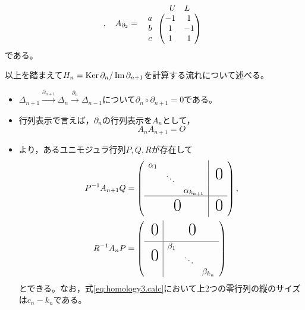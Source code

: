 \documentclass[uplatex]{jsarticle}
\begin{document}
\begin{rei}[射影平面の場合]
\begin{equation}
\begin{array}{c@{\,}c}
    \end{array}
    , \quad 
    A_{\partial_{2}} = \begin{array}{c@{\,}c}
      & \begin{array}{cc}
        U & L
      \end{array} \\
      \begin{array}{c}
        a \\ b \\ c
      \end{array} &
      \begin{pmatrix}
      -1 & 1 \\
      1 & -1 \\
      1 & 1
    \end{pmatrix}
  \end{array}
  \end{equation}
  である。
\end{rei}

以上を踏まえて$H_{n} = \operatorname{Ker} \partial_{n} / \operatorname{Im} \partial_{n+1}$を計算する流れについて述べる。

\sukima{}
\begin{itemize}
  \item $\Delta_{n+1} \xrightarrow{\partial_{n+1}} \Delta_{n} \xrightarrow{\partial_{n}} \Delta_{n-1}$について$\partial_{n} \circ \partial_{n+1} = 0$である。
  \item 行列表示で言えば，$\partial_{n}$の行列表示を$A_{n}$として，
  \begin{equation}
    A_{n} A_{n+1} = O
  \end{equation}
  \item {}より，あるユニモジュラ行列$P,Q,R$が存在して
  \begin{align}
    P^{-1} A_{n+1} Q &=
    \left( \begin{array}{ccc|c}
      \alpha_{1} &        &                  & \multirow{3}{*}{\BigZero} \\
                 & \ddots &                  & \\
                 &        & \alpha_{k_{n+1}} & \\ \hline
      \multicolumn{3}{c|}{\BigZero} & \BigZero
    \end{array} \right), \\
    \label{eq:homology3.calc}
    R^{-1} A_{n} P &=
    \left( \begin{array}{c|ccc}
      \BigZero                  & \multicolumn{3}{c}{\BigZero} \\ \hline
      \multirow{3}{*}{\BigZero} & \beta_{1} &        & \\
                                &           & \ddots & \\
                                &           &        & \beta_{k_{n}} \\
    \end{array} \right)
  \end{align}
  とできる。なお，式\eqref{eq:homology3.calc}において上2つの零行列の縦のサイズは$c_{n} - k_{n}$である。
\end{itemize}
\end{document}
